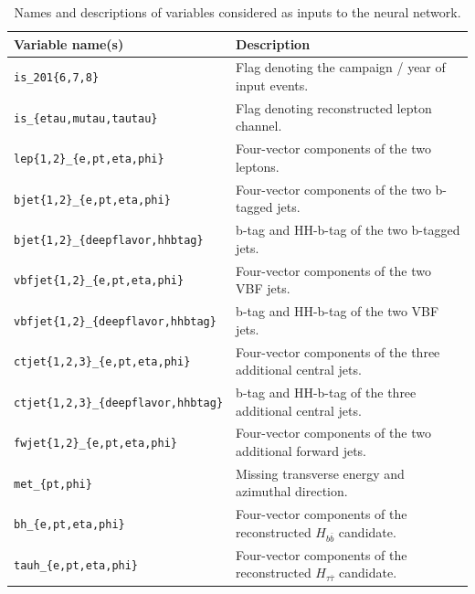 \documentclass[../main.tex]{subfiles}
\begin{document}
\begin{table}[h!]
    \centering
    \footnotesize
      \begin{tabular}{|l|l|}
        \hline
        Variable name(s)                               & Description                                                                 \\
        \hline
        \texttt{is\_201\{6,7,8\}}                      & Flag denoting the campaign / year of input events.                          \\
        \texttt{is\_\{etau,mutau,tautau\}}             & Flag denoting reconstructed lepton channel.                                 \\
        \texttt{lep\{1,2\}\_\{e,pt,eta,phi\}}          & Four-vector components of the two leptons.                                  \\
        \texttt{bjet\{1,2\}\_\{e,pt,eta,phi\}}         & Four-vector components of the two b-tagged jets.                            \\
        \texttt{bjet\{1,2\}\_\{deepflavor,hhbtag\}}    & b-tag and HH-b-tag of the two b-tagged jets.                                \\
        \texttt{vbfjet\{1,2\}\_\{e,pt,eta,phi\}}       & Four-vector components of the two VBF jets.                                 \\
        \texttt{vbfjet\{1,2\}\_\{deepflavor,hhbtag\}}  & b-tag and HH-b-tag of the two VBF jets.                                     \\
        \texttt{ctjet\{1,2,3\}\_\{e,pt,eta,phi\}}      & Four-vector components of the three additional central jets.                \\
        \texttt{ctjet\{1,2,3\}\_\{deepflavor,hhbtag\}} & b-tag and HH-b-tag of the three additional central jets.                    \\
        \texttt{fwjet\{1,2\}\_\{e,pt,eta,phi\}}        & Four-vector components of the two additional forward jets.                  \\
        \texttt{met\_\{pt,phi\}}                       & Missing transverse energy and azimuthal direction.                          \\
        \texttt{bh\_\{e,pt,eta,phi\}}                  & Four-vector components of the reconstructed $H_{b\bar{b}}$ candidate.       \\
        \texttt{tauh\_\{e,pt,eta,phi\}}                & Four-vector components of the reconstructed $H_{\tau\bar{\tau}}$ candidate. \\
        \hline
      \end{tabular}
     \caption[Variables used as input for the multi-class DNN]{Names and descriptions of variables considered as inputs to the neural network.}
    \label{hh:tab:multi_variables}
\end{table}
\end{document}
